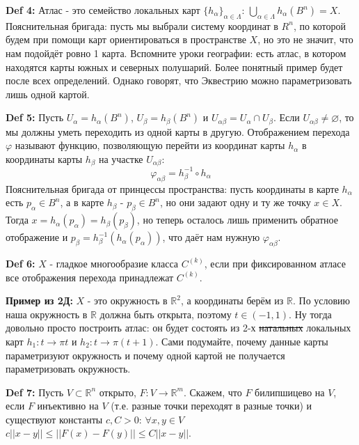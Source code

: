 \documentclass[book, 11pt]{report}
\begin{document}
\par{\textbf{Def 4: }Атлас - это семейство локальных карт $\{h_\alpha\}_{\alpha\in\Lambda}$: $\displaystyle\bigcup_{\alpha\in\Lambda} h_\alpha(B^n)=X.$ \\
Пояснительная бригада: пусть мы выбрали систему координат в $R^n$, по которой будем при помощи карт ориентироваться в пространстве $X$, но это не значит, что нам подойдёт ровно 1 карта. Вспомните уроки географии: есть атлас, в котором находятся карты южных и северных полушарий. Более понятный пример будет после всех определений. Однако говорят, что Эквестрию можно параметризовать лишь одной картой.}
\vspace{0.5cm}
\par{\textbf{Def 5: }Пусть $U_{\alpha}=h_{\alpha}(B^n)$, $U_{\beta}=h_{\beta}(B^n)$ и $U_{\alpha\beta}=U_\alpha\cap U_\beta$. Если $U_{\alpha\beta}\ne\varnothing$, то мы должны уметь переходить из одной карты в другую. Отображением перехода $\varphi$ называют функцию, позволяющую перейти из координат карты $h_\alpha$ в координаты карты $h_\beta$ на участке $U_{\alpha\beta}$:
\begin{equation*}
    \varphi_{\alpha\beta}=h^{-1}_\beta\circ h_\alpha
\end{equation*}
Пояснительная бригада от принцессы пространства: пусть координаты в карте $h_\alpha$ есть $p_\alpha\in B^n$, а в карте $h_\beta$ - $p_\beta\in B^n$, но они задают одну и ту же точку $x\in X$. Тогда $x=h_\alpha(p_\alpha)=h_\beta(p_\beta)$, но теперь осталось лишь применить обратное отображение и $p_\beta=h^{-1}_\beta(h_\alpha(p_\alpha))$, что даёт нам нужную $\varphi_{\alpha\beta}.$
}
\vspace{0.5cm}
\par{
\textbf{Def 6: }$X$ - гладкое многообразие класса $C^{(k)}$, если при фиксированном атласе все отображения перехода принадлежат $C^{(k)}$.
}
\vspace{0.5cm}
\par{\textbf{Пример из 2Д: } $X$ - это окружность в $\mathbb{R}^2$, а координаты берём из $\mathbb{R}$. По условию наша окружность в $\mathbb{R}$ должна быть открыта, поэтому $t\in(-1,1)$. Ну тогда довольно просто построить атлас: он будет состоять из 2-х \sout{натальных} локальных карт $h_1:t\to\pi t$ и $h_2:t\to\pi(t+1)$. Сами подумайте, почему данные карты параметризуют окружность и почему одной картой не получается параметризовать окружность.}
\vspace{0.5cm}
\par{\textbf{Def 7: }Пусть $V\subset\mathbb{R}^n$ открыто, $F:V\to\mathbb{R}^m$. Скажем, что $F$ билипшицево на $V$, если $F$ инъективно на $V$ (т.е. разные точки переходят в разные точки) и существуют константы $c,C>0$: $\forall x,y\in V$ $c||x-y||\leq ||F(x)-F(y)||\leq C||x-y||$.} 
\end{document}
